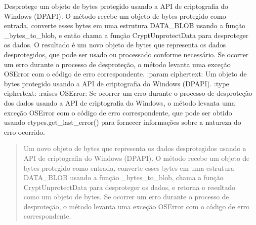 \documentclass[letterpaper,10pt,english]{sphinxmanual}
\begin{document}

\begin{fulllineitems}
\label{\detokenize{api/simple_lock:simple_lock.dpapi_unprotect}}
\pysigstartsignatures
\pysiglinewithargsret
{}
{}
{}
\pysigstopsignatures
\sphinxAtStartPar
Desprotege um objeto de bytes protegido usando a API de criptografia do Windows (DPAPI). O método recebe um objeto de bytes protegido como entrada, converte esses bytes em uma estrutura DATA\_BLOB usando a função \_bytes\_to\_blob, e então chama a função CryptUnprotectData para desproteger os dados. O resultado é um novo objeto de bytes que representa os dados desprotegidos, que pode ser usado ou processado conforme necessário. Se ocorrer um erro durante o processo de desproteção, o método levanta uma exceção OSError com o código de erro correspondente.
:param ciphertext: Um objeto de bytes protegido usando a API de criptografia do Windows (DPAPI).
:type ciphertext: 
:raises OSError: Se ocorrer um erro durante o processo de desproteção dos dados usando a API de criptografia do Windows, o método levanta uma exceção OSError com o código de erro correspondente, que pode ser obtido usando ctypes.get\_last\_error() para fornecer informações sobre a natureza do erro ocorrido.
\begin{quote}\begin{description}
\sphinxAtStartPar
Um novo objeto de bytes que representa os dados desprotegidos usando a API de criptografia do Windows (DPAPI). O método recebe um objeto de bytes protegido como entrada, converte esses bytes em uma estrutura DATA\_BLOB usando a função \_bytes\_to\_blob, chama a função CryptUnprotectData para desproteger os dados, e retorna o resultado como um objeto de bytes. Se ocorrer um erro durante o processo de desproteção, o método levanta uma exceção OSError com o código de erro correspondente.

\sphinxAtStartPar
{}

\end{description}\end{quote}

\end{fulllineitems}
\end{document}
